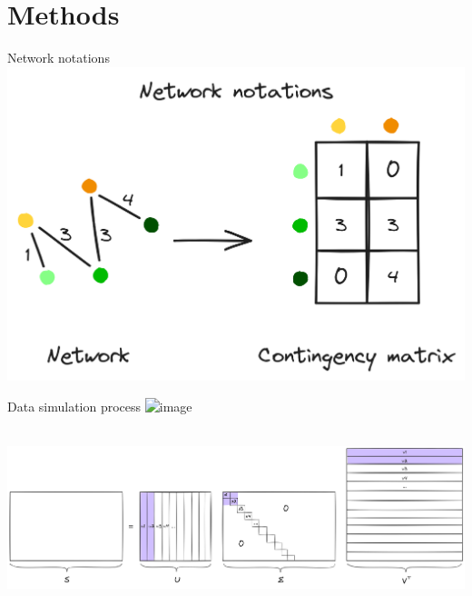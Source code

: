 \documentclass{beamer}
\begin{document}
\section{}

\section{Methods}

\begin{frame}{Network notations}
  \centering
  \includegraphics[height=0.7\textheight, keepaspectratio]{figures_slides/netw_notation.png}%
\end{frame}

\begin{frame}{Data simulation process}
  \centering
  \includegraphics<1->[height=0.95\textheight, keepaspectratio]{figures_slides/Netw_generation.png}%
\end{frame}

\begin{frame}{}
  \\ [0.5cm]
  \centering
  \includegraphics[width=\linewidth, keepaspectratio]{figures_slides/SVD.png}%
\end{frame}
\end{document}
